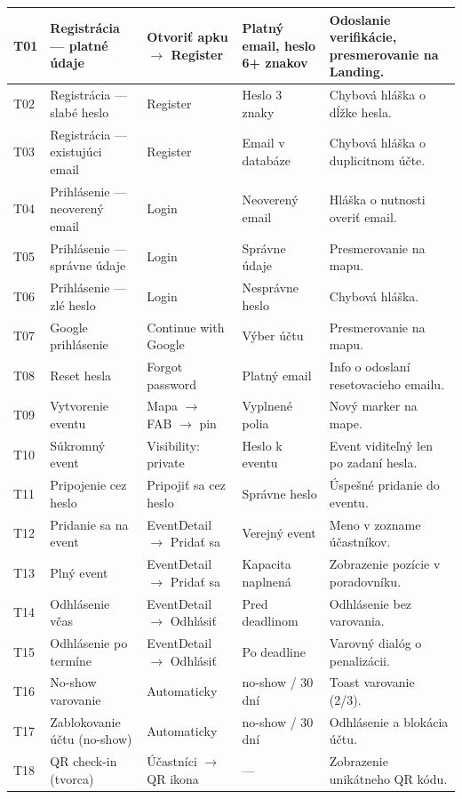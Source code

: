 \documentclass[12pt,a4paper]{article}
\begin{document}
\begin{tabularx}{\textwidth}{@{} l >{\RaggedRight}p{2.5cm} >{\RaggedRight}p{3cm} >{\RaggedRight}p{2.5cm} >{\RaggedRight}X @{} }
T01 & Registrácia — platné údaje & Otvoriť apku $\rightarrow$ Register & Platný email, heslo 6+ znakov & Odoslanie verifikácie, presmerovanie na Landing. \\ \midrule
T02 & Registrácia — slabé heslo & Register & Heslo 3 znaky & Chybová hláška o dĺžke hesla. \\ \midrule
T03 & Registrácia — existujúci email & Register & Email v databáze & Chybová hláška o duplicitnom účte. \\ \midrule
T04 & Prihlásenie — neoverený email & Login & Neoverený email & Hláška o nutnosti overiť email. \\ \midrule
T05 & Prihlásenie — správne údaje & Login & Správne údaje & Presmerovanie na mapu. \\ \midrule
T06 & Prihlásenie — zlé heslo & Login & Nesprávne heslo & Chybová hláška. \\ \midrule
T07 & Google prihlásenie & Continue with Google & Výber účtu & Presmerovanie na mapu. \\ \midrule
T08 & Reset hesla & Forgot password & Platný email & Info o odoslaní resetovacieho emailu. \\ \midrule
T09 & Vytvorenie eventu & Mapa $\rightarrow$ FAB $\rightarrow$ pin & Vyplnené polia & Nový marker na mape. \\ \midrule
T10 & Súkromný event & Visibility: private & Heslo k eventu & Event viditeľný len po zadaní hesla. \\ \midrule
T11 & Pripojenie cez heslo & Pripojiť sa cez heslo & Správne heslo & Úspešné pridanie do eventu. \\ \midrule
T12 & Pridanie sa na event & EventDetail $\rightarrow$ Pridať sa & Verejný event & Meno v zozname účastníkov. \\ \midrule
T13 & Plný event & EventDetail $\rightarrow$ Pridať sa & Kapacita naplnená & Zobrazenie pozície v poradovníku. \\ \midrule
T14 & Odhlásenie včas & EventDetail $\rightarrow$ Odhlásiť & Pred deadlinom & Odhlásenie bez varovania. \\ \midrule
T15 & Odhlásenie po termíne & EventDetail $\rightarrow$ Odhlásiť & Po deadline & Varovný dialóg o penalizácii. \\ \midrule
T16 & No-show varovanie & Automaticky & 2 no-show / 30 dní & Toast varovanie (2/3). \\ \midrule
T17 & Zablokovanie účtu (no-show) & Automaticky & 3 no-show / 30 dní & Odhlásenie a blokácia účtu. \\ \midrule
T18 & QR check-in (tvorca) & Účastníci $\rightarrow$ QR ikona & --- & Zobrazenie unikátneho QR kódu. \\ \midrule

\end{tabularx}
\end{document}
